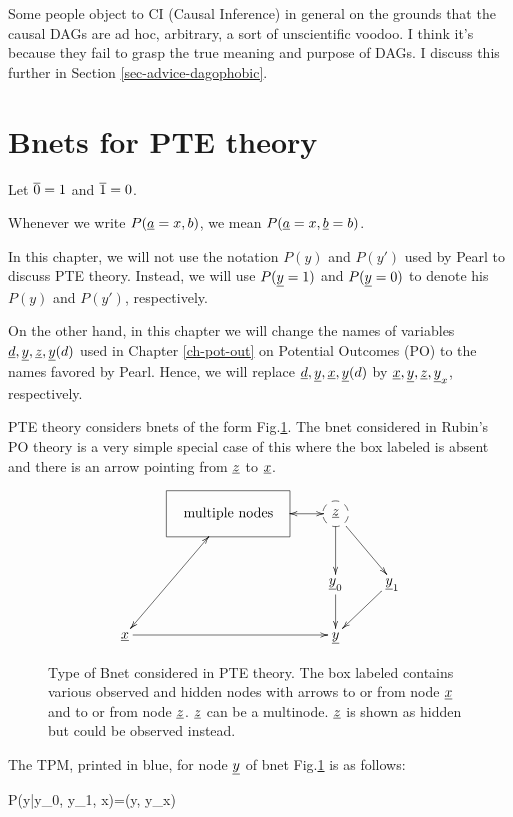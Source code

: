 Some people object to  CI (Causal Inference) in general on the
grounds that the causal DAGs
 are ad hoc, arbitrary, a
sort of unscientific voodoo. I think it’s because they fail to grasp the
true meaning
and purpose of DAGs.
I discuss this further
in Section \ref{sec-advice-dagophobic}.






\section{Bnets for PTE theory}
\quad

Let $\overline{0}=1$ and $\overline{1}=0$.

Whenever we write $P(\rva=x, b)$,
we mean $P(\rva=x, \rvb=b)$.

In this chapter, we will
not use the notation
$P(y)$ and $P(y')$
used by Pearl to
discuss PTE theory.
Instead, we will
use $P(\rvy=1)$ and
$P(\rvy=0)$
to denote his
$P(y)$ and $P(y')$, respectively.


On the other hand,
in this chapter
we will change the names
of variables $\rvd, \rvy, \rvz, \rvy(d)$
used
in Chapter \ref{ch-pot-out} on Potential
Outcomes (PO)
to the names favored by Pearl.
Hence, we will replace
$\rvd, \rvy, \rvx, \rvy(d)$
by
$\rvx, \rvy, \rvz, \rvy_x$,
respectively.



PTE theory considers bnets of the form
Fig.\ref{fig-pte-bnet}.
The bnet considered in Rubin's
PO theory
is a very simple special case
of this where the box
labeled 
is absent and there is an
arrow pointing
from $\rvz$ to $\rvx$.


\begin{figure}[h!]
$$
\xymatrix{
&*++++[F]{\text{multiple nodes}}\ar@{<->}[ldd]
\ar@{<->}[r]
&*++[F-o]{\rvz}\ar[rd]\ar[d]
\\
&&\rvy_0\ar[d]
&\rvy_1\ar[ld]
\\
\rvx\ar[rr]
&&\rvy
}$$
\caption{Type of Bnet
considered in PTE theory.
The box labeled 
contains various observed
and hidden nodes with
arrows
to or from node $\rvx$
and to or from
node $\rvz$.
$\rvz$ can be a multinode.
$\rvz$
is shown
as hidden but
could be observed instead.
}
\label{fig-pte-bnet}
\end{figure}

The TPM, printed in blue,
 for node $\rvy$
of bnet Fig.\ref{fig-pte-bnet}
is as follows:


\beq\color{blue}
P(y|y_0, y_1, x)=\delta(y, y_x)
\label{eq-tpm-y-yx}
\eeq

